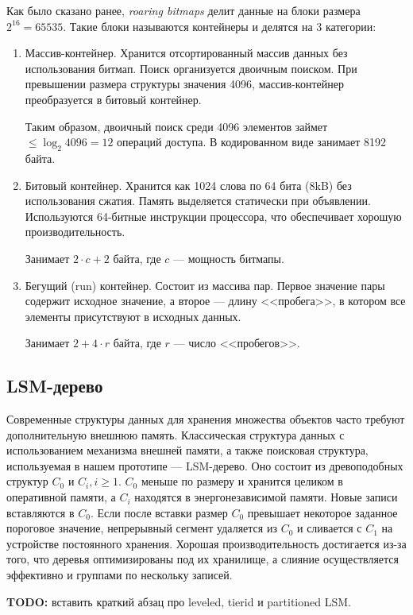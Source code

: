 Как было сказано ранее, \textit{roaring bitmaps} делит данные на блоки размера
$2^{16} = 65535$. Такие блоки называются контейнеры и делятся на 3 категории:
\begin{enumerate}
    \item Массив-контейнер. Хранится отсортированный массив данных без использования
    битмап. Поиск организуется двоичным поиском. При превышении размера структуры
    значения 4096, массив-контейнер преобразуется в битовый контейнер.

    Таким образом, двоичный поиск среди 4096 элементов займет $\leq \log_2{4096}
    = 12$ операций доступа. В кодированном виде занимает 8192 байта.
    \item Битовый контейнер. Хранится как 1024 слова по 64 бита (8kB) без
    использования сжатия. Память выделяется статически при объявлении. Используются
    64-битные инструкции процессора, что обеспечивает хорошую производительность.

    Занимает $2 \cdot c+2$ байта, где $c$ — мощность битмапы.
    \item Бегущий (run) контейнер. Состоит из массива пар. Первое значение пары
    содержит исходное значение, а второе — длину <<пробега>>, в котором все элементы
    присутствуют в исходных данных.

    Занимает $2+4\cdot r$ байта, где $r$ — число <<пробегов>>.
\end{enumerate}

\subsection{LSM-дерево}

Современные структуры данных для хранения множества объектов часто требуют
дополнительную внешнюю память. Классическая структура данных с использованием механизма
внешней памяти, а также поисковая структура, используемая в нашем прототипе —
LSM-дерево. Оно состоит из древоподобных структур $C_0$ и $C_i, i \ge 1$.
$C_0$ меньше по размеру и хранится
целиком в оперативной памяти, а $C_i$ находятся в энергонезависимой памяти. Новые
записи вставляются в $C_0$. Если после вставки размер $C_0$ превышает некоторое заданное
пороговое значение, непрерывный сегмент удаляется из $C_0$ и сливается с $C_1$ на устройстве
постоянного хранения. Хорошая производительность достигается из-за того, что деревья
оптимизированы под их хранилище, а слияние осуществляется эффективно и группами по
нескольку записей.

\textbf{TODO:} вставить краткий абзац про leveled, tierid и partitioned LSM.

